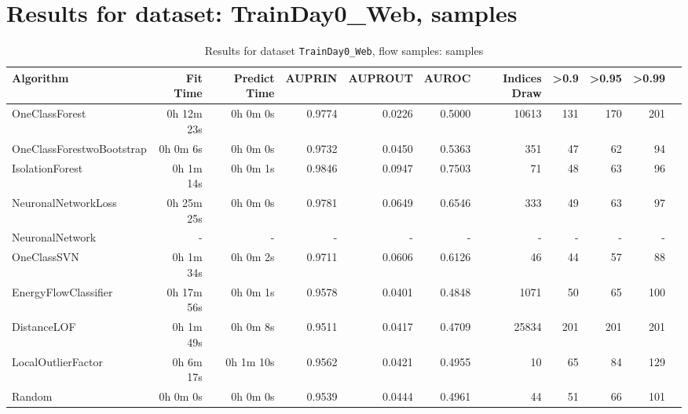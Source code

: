\documentclass{article}
\begin{document}
\section*{Results for dataset: TrainDay0_Web, samples}
\begin{table}[h!]
\centering
\caption{Results for dataset \texttt{TrainDay0_Web}, flow samples: samples}
\label{tab:trainday0web_samples}
\begin{tabular}{lrrrrrrrrrr}
\toprule
Algorithm & Fit Time & Predict Time & AUPRIN & AUPROUT & AUROC & Indices Draw & >0.9 & >0.95 & >0.99 \\
\midrule
OneClassForest & 0h 12m 23s & 0h 0m 0s & 0.9774 & 0.0226 & 0.5000 & 10613 & 131 & 170 & 201 \\
OneClassForestwoBootstrap & 0h 0m 6s & 0h 0m 0s & 0.9732 & 0.0450 & 0.5363 & 351 & 47 & 62 & 94 \\
IsolationForest & 0h 1m 14s & 0h 0m 1s & 0.9846 & 0.0947 & 0.7503 & 71 & 48 & 63 & 96 \\
NeuronalNetworkLoss & 0h 25m 25s & 0h 0m 0s & 0.9781 & 0.0649 & 0.6546 & 333 & 49 & 63 & 97 \\
NeuronalNetwork & - & - & - & - & - & - & - & - & - \\
OneClassSVN & 0h 1m 34s & 0h 0m 2s & 0.9711 & 0.0606 & 0.6126 & 46 & 44 & 57 & 88 \\
EnergyFlowClassifier & 0h 17m 56s & 0h 0m 1s & 0.9578 & 0.0401 & 0.4848 & 1071 & 50 & 65 & 100 \\
DistanceLOF & 0h 1m 49s & 0h 0m 8s & 0.9511 & 0.0417 & 0.4709 & 25834 & 201 & 201 & 201 \\
LocalOutlierFactor & 0h 6m 17s & 0h 1m 10s & 0.9562 & 0.0421 & 0.4955 & 10 & 65 & 84 & 129 \\
Random & 0h 0m 0s & 0h 0m 0s & 0.9539 & 0.0444 & 0.4961 & 44 & 51 & 66 & 101 \\
\bottomrule
\end{tabular}
\end{table}
\end{document}
